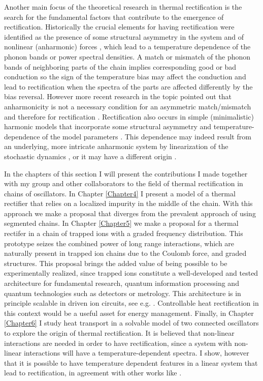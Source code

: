 Another main focus of the theoretical research in thermal rectification is the search for the fundamental factors that contribute to the emergence of rectification. Historically the crucial elements for having rectification were identified as the presence of some structural asymmetry in the system and of nonlinear (anharmonic) forces \cite{Zeng2008,Katz2016,Li2008,Hu2006,Benenti2016,Li2012,Segal2005,Segal2005b}, which lead to a temperature dependence of the phonon bands or power spectral densities. A match or mismatch of the phonon bands of neighboring parts of the chain implies corresponding good or bad conduction so the
sign of the temperature bias may affect the conduction and lead to rectification when the spectra of the parts are affected differently by the bias reversal. However more recent research in the topic pointed out  that anharmonicity is not a necessary condition for an asymmetric match/mismatch and therefore for rectification \cite{Pereira2017}. Rectification also occurs in simple (minimalistic) harmonic models that incorporate some structural asymmetry and temperature-dependence of the model parameters \cite{Pereira2017}. This dependence may indeed result from an underlying, more intricate  anharmonic system by linearization of the stochastic dynamics \cite{Pereira2017,Pereira2019}, or it may have a different origin \cite{Simon2019}.

In the chapters of this section I will present the contributions I made together with my group and other collaborators to the field of thermal rectification in chains of oscillators. In Chapter \ref{Chapter4} I present a model of a thermal rectifier that relies on a localized impurity in the middle of the chain. With this approach we make a proposal that diverges from the prevalent approach of using segmented chains. In Chapter \ref{Chapter5} we make a proposal for a thermal rectifer in a chain of trapped ions with a graded frequency distribution. This prototype seizes the combined power of long range interactions, which are naturally present in trapped ion chains due to the Coulomb force, and graded structures. This proposal brings the added value of being possible to be experimentally realized, since trapped ions constitute a well-developed and tested  architecture for fundamental research, quantum information processing and quantum technologies such as detectors or metrology. This architecture is  in principle scalable in driven ion circuits, see e.g. \cite{Bruzewicz2019}. Controllable heat rectification in this context
would be a useful asset for energy management. Finally, in Chapter \ref{Chapter6} I study heat transport in a solvable model of two connected oscillators to explore the origin of thermal rectification. It is believed that non-linear interactions are needed in order to have rectification, since a system with non-linear interactions will have a temperature-dependent spectra. I show, however that it is possible to have temperature dependent features in a linear system that lead to rectification, in agreement with other works like \cite{Pereira2017}.
